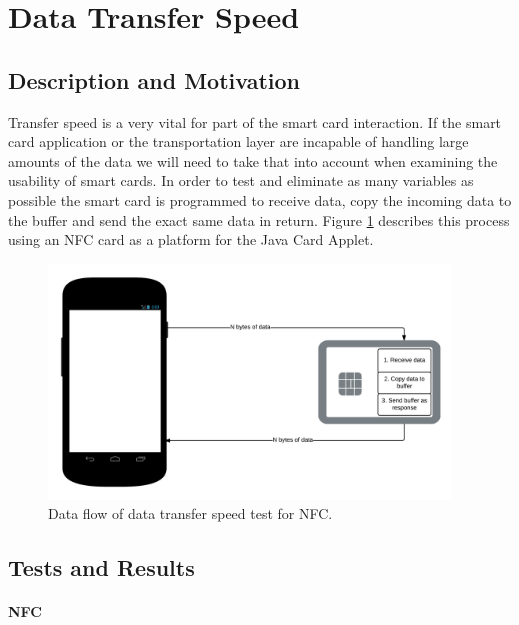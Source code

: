 \section{Data Transfer Speed}
\subsection{Description and Motivation}
Transfer speed is a very vital for part of the smart card interaction. If the smart card application or the transportation layer are incapable of handling large amounts of the data we will need to take that into account when examining the usability of smart cards. In order to test and eliminate as many variables as possible the smart card is programmed to receive data, copy the incoming data to the buffer and send the exact same data in return. Figure \ref{fig:nfcDataflowTest} describes this process using an NFC card as a platform for the Java Card Applet.

\begin{figure}[h!]
  \caption{Data flow of data transfer speed test for NFC.}
  \label{fig:nfcDataflowTest}
  \centering
    \includegraphics[width=0.95\textwidth]{images/NFCTransferTest.png}
\end{figure}

\subsection{Tests and Results}
\paragraph{NFC}\mbox{}\\



